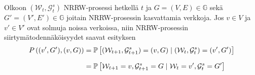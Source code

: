\documentclass[finnish, 12pt, a4paper, sci, utf8, pdfa]{aaltothesis}
\newcommand{\Grandom}{\mathcal{G}}
\newcommand{\Wrandom}{\mathcal{W}}
\newcommand*{\prob}{\mathbb{P}}
\begin{document}
Olkoon $ (\Wrandom_{t}, \Grandom^{s}_{t}) $ NRRW-prosessi hetkellä $ t $ ja $ G = (V, E) \in \mathbb{G} $ sekä $ G' = (V', E') \in \mathbb{G} $ joitain NRRW-prosessin kasvattamia verkkoja. 
Jos $ v \in V $ ja $ v' \in V' $ ovat solmuja noissa verkoissa, niin NRRW-prosessin siirtymätodennäköisyydet saavat esityksen
\begin{equation}
   \setlength{\jot}{10pt}
   \begin{aligned}
      P\left( (v', G'), (v, G) \right) &= \prob \left[ (\Wrandom_{t+1}, \Grandom^{s}_{t+1}) = (v, G) \mid (\Wrandom_{t}, \Grandom^{s}_{t}) = (v', G') \right] \\
                                       &= \prob \left[ \Wrandom_{t+1} = v, \Grandom^{s}_{t+1} = G \mid \Wrandom_{t} = v', \Grandom^{s}_{t} = G' \right]
      \label{equation:siirtyma-tn}
   \end{aligned}
\end{equation}
\end{document}
